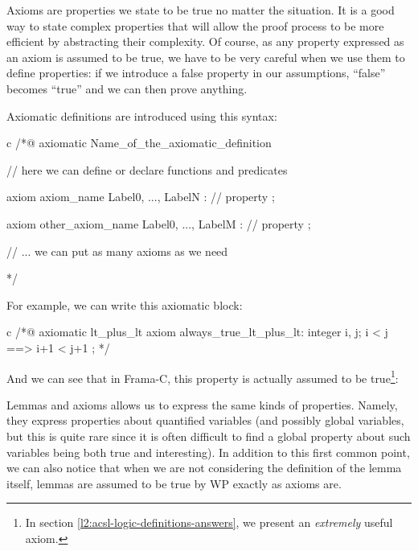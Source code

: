Axioms are properties we state to be true no matter the situation. It is
a good way to state complex properties that will allow the proof process
to be more efficient by abstracting their complexity. Of course, as any
property expressed as an axiom is assumed to be true, we have to be very
careful when we use them to define properties: if we introduce a false
property in our assumptions, ``false'' becomes ``true'' and we can then
prove anything.





Axiomatic definitions are introduced using this syntax:



\begin{CodeBlock}{c}
/*@
  axiomatic Name_of_the_axiomatic_definition {
    // here we can define or declare functions and predicates

    axiom axiom_name { Label0, ..., LabelN }:
      // property ;

    axiom other_axiom_name { Label0, ..., LabelM }:
      // property ;

    // ... we can put as many axioms as we need
  }
*/
\end{CodeBlock}



For example, we can write this axiomatic block:



\begin{CodeBlock}{c}
/*@
  axiomatic lt_plus_lt{
    axiom always_true_lt_plus_lt:
      \forall integer i, j; i < j ==> i+1 < j+1 ;
  }
*/
\end{CodeBlock}



And we can see that in Frama-C, this property is actually assumed to be
true\footnote{In section \ref{l2:acsl-logic-definitions-answers}, we
present an {\em extremely} useful axiom.}:










Lemmas and axioms allows us to express the same kinds of properties.
Namely, they express properties about quantified variables (and possibly
global variables, but this is quite rare since it is often difficult to
find a global property about such variables being both true and
interesting). In addition to this first common point, we can also notice that
when we are not considering the definition of the lemma itself, lemmas
are assumed to be true by WP exactly as axioms are.




